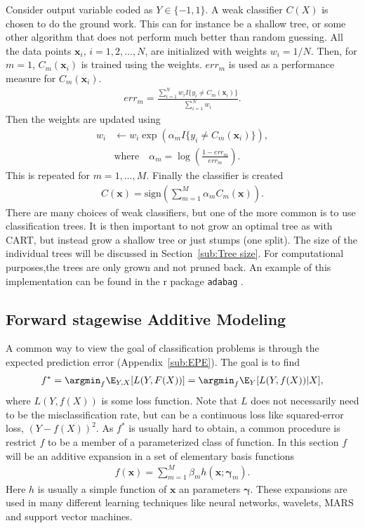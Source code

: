 Consider output variable coded as $Y \in \{-1, 1\}$. A weak classifier $C(X)$ is chosen to do the ground work. This can for instance be a shallow tree, or some other algorithm that does not perform much better than random guessing. All the data points $\mathbf{x}_i$, $i = 1, 2, \ldots, N$, are initialized with weights $w_i = 1/N$. Then, for $m = 1$, $C_m(\mathbf{x}_i)$ is trained using the weights. $err_m$ is used as a performance measure for $C_m(\mathbf{x}_i)$.
\begin{align}
  err_m =  \frac{\sum^{N}_{i=1} w_i I\{y_i \neq C_m(\mathbf{x}_i)\}}{\sum^{N}_{i=1} w_i}.
\end{align}
Then the weights are updated using 
\begin{align}
  w_i &\leftarrow w_i \exp\left( \alpha_m I\{y_i \neq C_m(\mathbf{x}_i)\} \right), \\
  &\text{where} \quad \alpha_m = \log\left(  \frac{1-err_m}{err_m} \right).
\end{align}
This is repeated for $m = 1, \ldots, M$. Finally the classifier is created
\begin{align}
  C( \mathbf{x}) = \text{sign}\left( \sum^{M}_{m=1} \alpha_m C_m(\mathbf{x}) \right).
\end{align}
There are many choices of weak classifiers, but one of the more common is to use classification trees. It is then important to not grow an optimal tree as with CART, but instead grow a shallow tree or just stumps (one split). The size of the individual trees will be discussed in Section~\ref{sub:Tree size}. For computational purposes,the trees are only grown and not pruned back.
An example of this implementation can be found in the r package \verb+adabag+ \cite{adabag}. 

\subsection{Forward stagewise Additive Modeling}
\label{sub:Forward stagewise additive modeling}
A common way to view the goal of classification problems is through the expected prediction error (Appendix~\ref{sub:EPE}). The goal is to find
\begin{align}
  \label{eq:fargmin} 
  f^* = \argmin_f \E_{Y, X}[L(Y,F(X))] = \argmin_f \E_Y [L(Y,f(X))|X] ,
\end{align}
where $L(Y, f(X))$ is some loss function. Note that $L$ does not necessarily need to be the misclassification rate, but can be a continuous loss like squared-error loss, $(Y - f(X))^2$. As $f^*$ is usually hard to obtain, a common procedure is restrict $f$ to be a member of a parameterized class of function. In this section $f$ will be an additive expansion in a set of elementary basis functions 
\begin{align}
  \label{eq:additive} 
  f(\mathbf{x}) =  \sum^{M}_{m=1} \beta_m h(\mathbf{x}; \bm{\gamma}_m).
\end{align}
Here $h$ is usually a simple function of $\mathbf{x}$ an parameters $\bm{\gamma}$. These expansions are used in many different learning techniques like neural networks, wavelets, MARS and support vector machines.

